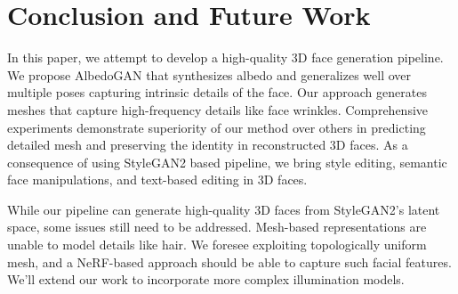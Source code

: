 \documentclass[10pt,twocolumn,letterpaper]{article}
\begin{document}
\section{Conclusion and Future Work}




In this paper, we attempt to develop a high-quality 3D face generation pipeline. We propose AlbedoGAN that synthesizes albedo and generalizes well over multiple poses capturing intrinsic details of the face. Our approach generates meshes that capture high-frequency details like face wrinkles. Comprehensive experiments demonstrate superiority of our method over others in predicting detailed mesh and preserving the identity in reconstructed 3D faces. 
As a consequence of using StyleGAN2 based pipeline, we bring style editing, semantic face manipulations, and text-based editing in 3D faces.



While our pipeline can generate high-quality 3D faces from StyleGAN2's latent space, some issues still need to be addressed. Mesh-based representations are unable to model details like hair. We foresee exploiting topologically uniform mesh, and a NeRF-based approach should be able to capture such facial features. We'll extend our work to incorporate more complex illumination models.






{\small


}
\end{document}
